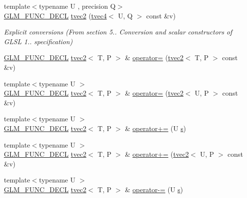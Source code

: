 \begin{DoxyCompactItemize}
{\footnotesize template$<$typename U , precision Q$>$ }\\\hyperlink{setup_8hpp_ab2d052de21a70539923e9bcbf6e83a51}{G\+L\+M\+\_\+\+F\+U\+N\+C\+\_\+\+D\+E\+CL} \hyperlink{structglm_1_1detail_1_1tvec2_a5a2a0de134fd7f21ba208978968611b8}{tvec2} (\hyperlink{structglm_1_1detail_1_1tvec4}{tvec4}$<$ U, Q $>$ const \&v)
\begin{DoxyCompactList}\small\item\em Explicit conversions (From section 5.. Conversion and scalar constructors of G\+L\+SL 1.. specification) \end{DoxyCompactList}\item 
\hyperlink{setup_8hpp_ab2d052de21a70539923e9bcbf6e83a51}{G\+L\+M\+\_\+\+F\+U\+N\+C\+\_\+\+D\+E\+CL} \hyperlink{structglm_1_1detail_1_1tvec2}{tvec2}$<$ T, P $>$ \& \hyperlink{structglm_1_1detail_1_1tvec2_aa28bba513156a189b4232806e7b6858e}{operator=} (\hyperlink{structglm_1_1detail_1_1tvec2}{tvec2}$<$ T, P $>$ const \&v)
\item 
{\footnotesize template$<$typename U $>$ }\\\hyperlink{setup_8hpp_ab2d052de21a70539923e9bcbf6e83a51}{G\+L\+M\+\_\+\+F\+U\+N\+C\+\_\+\+D\+E\+CL} \hyperlink{structglm_1_1detail_1_1tvec2}{tvec2}$<$ T, P $>$ \& \hyperlink{structglm_1_1detail_1_1tvec2_ac45d730db8173a1fe3b738bf4ac07fb3}{operator=} (\hyperlink{structglm_1_1detail_1_1tvec2}{tvec2}$<$ U, P $>$ const \&v)
\item 
{\footnotesize template$<$typename U $>$ }\\\hyperlink{setup_8hpp_ab2d052de21a70539923e9bcbf6e83a51}{G\+L\+M\+\_\+\+F\+U\+N\+C\+\_\+\+D\+E\+CL} \hyperlink{structglm_1_1detail_1_1tvec2}{tvec2}$<$ T, P $>$ \& \hyperlink{structglm_1_1detail_1_1tvec2_ada190d862b2574a8d77b0d795d0af619}{operator+=} (U \hyperlink{structglm_1_1detail_1_1tvec2_a6d602cf7c31b75396944d828ad2aea72}{s})
\item 
{\footnotesize template$<$typename U $>$ }\\\hyperlink{setup_8hpp_ab2d052de21a70539923e9bcbf6e83a51}{G\+L\+M\+\_\+\+F\+U\+N\+C\+\_\+\+D\+E\+CL} \hyperlink{structglm_1_1detail_1_1tvec2}{tvec2}$<$ T, P $>$ \& \hyperlink{structglm_1_1detail_1_1tvec2_a5bf9b1beecee7857fa22de1c8600e619}{operator+=} (\hyperlink{structglm_1_1detail_1_1tvec2}{tvec2}$<$ U, P $>$ const \&v)
\item 
{\footnotesize template$<$typename U $>$ }\\\hyperlink{setup_8hpp_ab2d052de21a70539923e9bcbf6e83a51}{G\+L\+M\+\_\+\+F\+U\+N\+C\+\_\+\+D\+E\+CL} \hyperlink{structglm_1_1detail_1_1tvec2}{tvec2}$<$ T, P $>$ \& \hyperlink{structglm_1_1detail_1_1tvec2_a790ae20229848462d697e3cd2247cb6d}{operator-\/=} (U \hyperlink{structglm_1_1detail_1_1tvec2_a6d602cf7c31b75396944d828ad2aea72}{s})

\end{DoxyCompactItemize}
